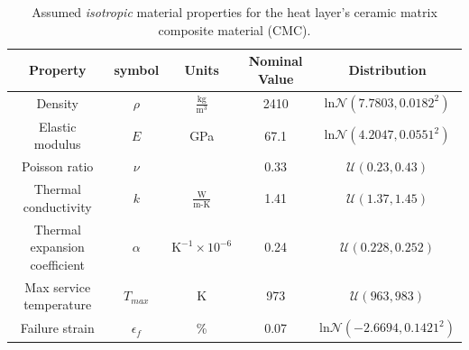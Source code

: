 \documentclass{article}
\begin{document}
\begin{table}
\caption[CMC material properties]{Assumed \textit{isotropic} material properties for the heat layer's ceramic matrix composite material (CMC).}
\label{tab:matPropCMC}
\begin{center}
\begin{tabular}[]{ c | c | c | c | c }
\textbf{Property} & \textbf{symbol} & \textbf{Units} & \textbf{Nominal Value} & \textbf{Distribution} \\ \hline
Density & $\rho$ & $\frac{\textrm{kg}}{\textrm{m}^3}$ & 2410 & $\textrm{ln}\mathcal{N}(7.7803,0.0182^2)$ \\ \hline
Elastic modulus & $E$ & GPa & 67.1 & $\textrm{ln}\mathcal{N}(4.2047,0.0551^2)$ \\ \hline
Poisson ratio & $\nu$ & & 0.33 & $\mathcal{U}(0.23,0.43)$\\ \hline
Thermal conductivity & $k$ & $\frac{\textrm{W}}{\textrm{m-K}}$ & 1.41 & $\mathcal{U}(1.37,1.45)$ \\ \hline
Thermal expansion coefficient & $\alpha$ & $\textrm{K}^{-1} \times 10^{-6}$ & 0.24 & $\mathcal{U}(0.228,0.252)$ \\ \hline \hline
Max service temperature & $T_{max}$ & K & 973 & $\mathcal{U}(963,983)$ \\ \hline
Failure strain & $\epsilon_{f}$ & \% & 0.07 & $\textrm{ln}\mathcal{N}(-2.6694,0.1421^2)$ \\ \hline
\end{tabular}
\end{center}
\end{table}
\end{document}
